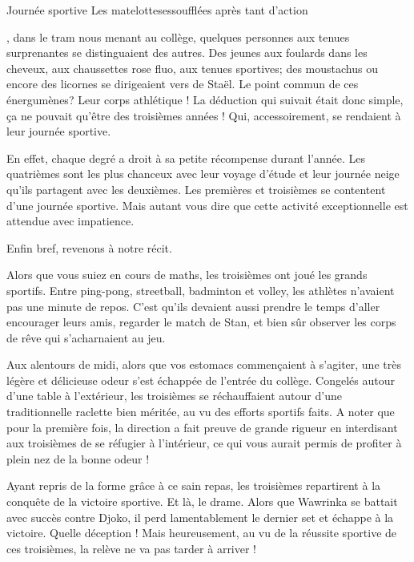 \vspace*{-1.9cm}
\begin{article}
{Journée sportive}
{Les matelottes}{essoufflées après tant d'action}

\begin{spacing}{.94}
, dans le tram nous menant au collège, quelques personnes aux tenues surprenantes se distinguaient des autres. Des jeunes aux foulards dans les cheveux, aux chaussettes rose fluo, aux tenues sportives; des moustachus ou encore des licornes se dirigeaient vers de Staël. Le point commun de ces énergumènes? Leur corps athlétique ! La déduction qui suivait était donc simple, ça ne pouvait qu'être des troisièmes années ! Qui, accessoirement, se rendaient à leur journée sportive.

En effet, chaque degré a droit à sa petite récompense durant l'année. Les quatrièmes sont les plus chanceux avec leur voyage d'étude et leur journée neige qu'ils partagent avec les deuxièmes. Les premières et troisièmes se contentent d'une journée sportive. Mais autant vous dire que cette activité exceptionnelle est attendue avec impatience.

Enfin bref, revenons à notre récit.

Alors que vous suiez en cours de maths,  les troisièmes ont joué les grands sportifs. Entre ping-pong, streetball, badminton et volley, les athlètes n'avaient pas une minute de repos. C'est qu'ils devaient aussi prendre le temps d'aller encourager leurs amis, regarder le match de Stan, et bien sûr observer les corps de rêve qui s'acharnaient au jeu.

Aux alentours de midi, alors que vos estomacs commençaient à s'agiter, une très légère et délicieuse odeur s'est échappée de l'entrée du collège. Congelés autour d'une table à l'extérieur, les troisièmes se réchauffaient autour d'une traditionnelle raclette bien méritée, au vu des efforts sportifs faits. A noter que pour la première fois, la direction a fait preuve de grande rigueur en interdisant aux troisièmes de se réfugier à l'intérieur, ce qui vous aurait permis de profiter à plein nez de la bonne odeur !

Ayant repris de la forme grâce à ce sain repas, les troisièmes repartirent à la conquête de la victoire sportive. Et là, le drame. Alors que Wawrinka se battait avec succès contre Djoko, il perd lamentablement le dernier set et échappe à la victoire. Quelle déception ! Mais heureusement, au vu de la réussite sportive de ces troisièmes, la relève ne va pas tarder à arriver !


\end{spacing}
\end{article}
